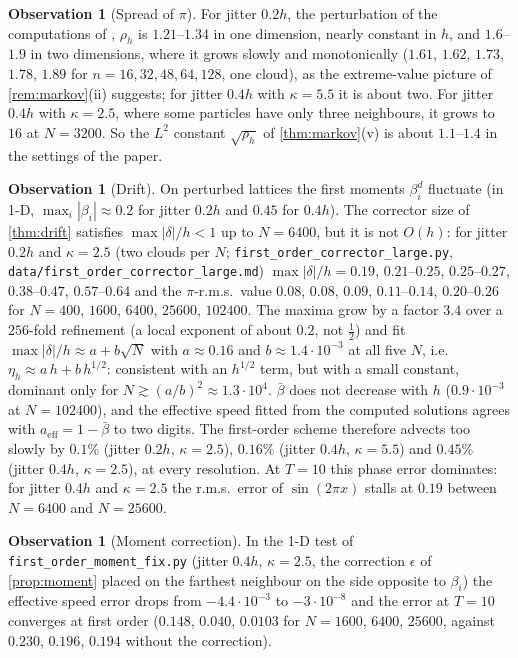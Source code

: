 \documentclass[11pt,a4paper]{article}
\theoremstyle{plain}
\theoremstyle{definition}
\newtheorem{observation}[theorem]{Observation}
\theoremstyle{remark}
\numberwithin{equation}{section}
\begin{document}
\begin{observation}[Spread of $\pi$]\label{obs:rho}
For jitter $0.2h$, the perturbation of the computations of \cite{JungMUSCL2026}, $\rho_h$ is $1.21$--$1.34$ in one dimension, nearly constant in $h$, and $1.6$--$1.9$ in two dimensions, where it grows slowly and monotonically ($1.61$, $1.62$, $1.73$, $1.78$, $1.89$ for $n=16,32,48,64,128$, one cloud), as the extreme-value picture of \cref{rem:markov}(ii) suggests; for jitter $0.4h$ with $\kappa=5.5$ it is about two. For jitter $0.4h$ with $\kappa=2.5$, where some particles have only three neighbours, it grows to $16$ at $N=3200$. So the $L^2$ constant $\sqrt{\rho_h}$ of \cref{thm:markov}(v) is about $1.1$--$1.4$ in the settings of the paper.
\end{observation}

\begin{observation}[Drift]\label{obs:drift}
On perturbed lattices the first moments $\beta^d_i$ fluctuate (in 1-D, $\max_i|\beta_i|\approx0.2$ for jitter $0.2h$ and $0.45$ for $0.4h$). The corrector size of \cref{thm:drift} satisfies $\max|\delta|/h<1$ up to $N=6400$, but it is not $O(h)$: for jitter $0.2h$ and $\kappa=2.5$ (two clouds per $N$; \texttt{first\_order\_corrector\_large.py}, \texttt{data/first\_order\_corrector\_large.md}) $\max|\delta|/h=0.19$, $0.21$--$0.25$, $0.25$--$0.27$, $0.38$--$0.47$, $0.57$--$0.64$ and the $\pi$-r.m.s.\ value $0.08$, $0.08$, $0.09$, $0.11$--$0.14$, $0.20$--$0.26$ for $N=400$, $1600$, $6400$, $25600$, $102400$. The maxima grow by a factor $3.4$ over a $256$-fold refinement (a local exponent of about $0.2$, not $\frac12$) and fit $\max|\delta|/h\approx a+b\sqrt N$ with $a\approx0.16$ and $b\approx1.4\cdot10^{-3}$ at all five $N$, i.e.\ $\eta_h\approx a\,h+b\,h^{1/2}$: consistent with an $h^{1/2}$ term, but with a small constant, dominant only for $N\gtrsim(a/b)^2\approx1.3\cdot10^4$. $\bar\beta$ does not decrease with $h$ ($0.9\cdot10^{-3}$ at $N=102400$), and the effective speed fitted from the computed solutions agrees with $a_{\mathrm{eff}}=1-\bar\beta$ to two digits. The first-order scheme therefore advects too slowly by $0.1\%$ (jitter $0.2h$, $\kappa=2.5$), $0.16\%$ (jitter $0.4h$, $\kappa=5.5$) and $0.45\%$ (jitter $0.4h$, $\kappa=2.5$), at every resolution. At $T=10$ this phase error dominates: for jitter $0.4h$ and $\kappa=2.5$ the r.m.s.\ error of $\sin(2\pi x)$ stalls at $0.19$ between $N=6400$ and $N=25600$.
\end{observation}

\begin{observation}[Moment correction]\label{obs:moment}
In the 1-D test of \texttt{first\_order\_moment\_fix.py} (jitter $0.4h$, $\kappa=2.5$, the correction $\epsilon$ of \cref{prop:moment} placed on the farthest neighbour on the side opposite to $\beta_i$) the effective speed error drops from $-4.4\cdot10^{-3}$ to $-3\cdot10^{-8}$ and the error at $T=10$ converges at first order ($0.148$, $0.040$, $0.0103$ for $N=1600$, $6400$, $25600$, against $0.230$, $0.196$, $0.194$ without the correction).
\end{observation}
\end{document}
